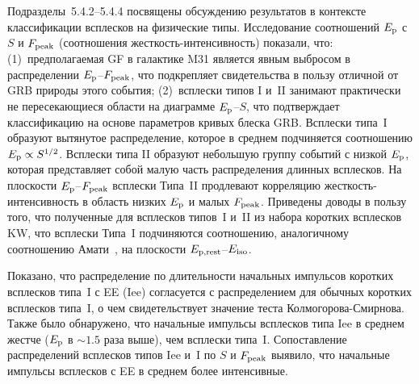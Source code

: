 Подразделы~5.4.2--5.4.4 посвящены обсуждению результатов в контексте классификации всплесков на физические типы.
Исследование соотношений $E_{\mathrm{p}}$ с $S$ и $F_{\mathrm{peak}}$
(соотношения жесткость-интенсивность) показали, что:
(1)~предполагаемая GF в галактике M31 является явным выбросом в распределении $E_{\mathrm{p}}$--$F_{\mathrm{peak}}$, 
что подкрепляет свидетельства в пользу отличной от GRB природы этого события;
(2)~всплески типов I и~II занимают практически не пересекающиеся области на диаграмме $E_{\mathrm{p}}$--$S$,
что подтверждает классификацию на основе параметров кривых блеска GRB.
Всплески типа~I образуют вытянутое распределение, которое в среднем подчиняется 
соотношению $E_{\mathrm{p}} \propto S^{1/2}$. Всплески типа II образуют небольшую группу событий
с низкой $E_{\mathrm{p}}$, которая представляет собой малую часть распределения длинных всплесков.
На плоскости $E_{\mathrm{p}}$--$F_{\mathrm{peak}}$ всплески Типа~II продлевают корреляцию 
жесткость-интенсивность в область низких $E_{\mathrm{p}}$ и малых $F_{\mathrm{peak}}$.
Приведены доводы в пользу того, что полученные для всплесков типов~I и~II из набора коротких 
всплесков KW, что всплески Типа~I подчиняются 
соотношению, аналогичному соотношению Амати~\citep{Amati_2002AandA}, 
на плоскости $E_{\mathrm{p,rest}}$--$E_{\mathrm{iso}}$.

Показано, что распределение по длительности начальных импульсов коротких всплесков 
типа~I с EE (Iee) согласуется с распределением для обычных коротких всплесков типа~I, 
о чем свидетельствует значение теста Колмогорова-Смирнова. 
Также было обнаружено, что начальные импульсы всплесков типа Iee в среднем 
жестче ($E_{\mathrm{p}}$ в $\sim 1.5$ раза выше), чем всплески типа~I. 
Сопоставление распределений 
всплесков типов Iee и~I по $S$ и $F_{\mathrm{peak}}$ выявило, что начальные импульсы 
всплесков с EE в среднем более интенсивные. 

